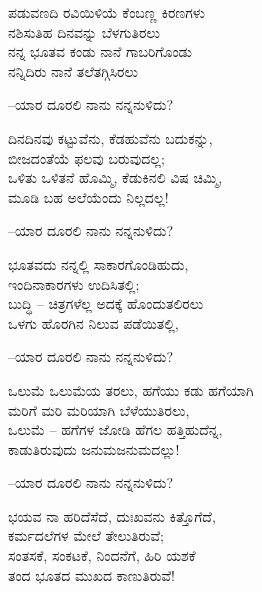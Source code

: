 \begin{myquote}
ಪಡುವಣದಿ ರವಿಯಿಳಿಯೆ ಕೆಂಬಣ್ಣ ಕಿರಣಗಳು\\ನಶಿಸುತಿಹ ದಿನವನ್ನು ಬೆಳಗುತಿರಲು\\ನನ್ನ ಭೂತವ ಕಂಡು ನಾನೆ ಗಾಬರಿಗೊಂಡು\\ನನ್ನಿದಿರು ನಾನೆ ತಲೆತಗ್ಗಿಸಿರಲು
\end{myquote}

\begin{flushright}
–ಯಾರ ದೂರಲಿ ನಾನು ನನ್ನನುಳಿದು?
\end{flushright}

\begin{myquote}
ದಿನದಿನವು ಕಟ್ಟುವೆನು, ಕೆಡಹುವೆನು ಬದುಕನ್ನು,\\ಬೀಜದಂತೆಯೆ ಫಲವು ಬರುವುದಲ್ಲ;\\ಒಳಿತು ಒಳಿತನೆ ಹೊಮ್ಮಿ, ಕೆಡುಕಿನಲಿ ವಿಷ ಚಿಮ್ಮಿ,\\ಮೂಡಿ ಬಹ ಅಲೆಯೆಂದು ನಿಲ್ಲದಲ್ಲ!
\end{myquote}

\begin{flushright}
–ಯಾರ ದೂರಲಿ ನಾನು ನನ್ನನುಳಿದು?
\end{flushright}

\begin{myquote}
ಭೂತವದು ನನ್ನಲ್ಲಿ ಸಾಕಾರಗೊಂಡಿಹುದು,\\ಇಂದಿನಾಕಾರಗಳು ಉದಿಸಿತಲ್ಲಿ;\\ಬುದ್ಧಿ – ಚಿತ್ರಗಳೆಲ್ಲ ಅದಕ್ಕೆ ಹೊಂದುತಲಿರಲು\\ಒಳಗು ಹೊರಗಿನ ನಿಲುವ ಪಡೆಯಿತಲ್ಲಿ,
\end{myquote}

\begin{flushright}
–ಯಾರ ದೂರಲಿ ನಾನು ನನ್ನನುಳಿದು?
\end{flushright}

\begin{myquote}
ಒಲುಮೆ ಒಲುಮೆಯ ತರಲು, ಹಗೆಯು ಕಡು ಹಗೆಯಾಗಿ\\ಮರಿಗೆ ಮರಿ ಮರಿಯಾಗಿ ಬೆಳೆಯುತಿರಲು,\\ಒಲುಮೆ – ಹಗೆಗಳ ಜೋಡಿ ಹೆಗಲ ಹತ್ತಿಹುದೆನ್ನ,\\ಕಾಡುತಿರುವುದು ಜನುಮಜನುಮದಲ್ಲು!
\end{myquote}

\begin{flushright}
–ಯಾರ ದೂರಲಿ ನಾನು ನನ್ನನುಳಿದು?
\end{flushright}

\begin{myquote}
ಭಯವ ನಾ ಹರಿದೆಸೆದೆ, ದುಃಖವನು ಕಿತ್ತೊಗೆದೆ,\\ಕರ್ಮದಲೆಗಳ ಮೇಲೆ ತೇಲುತಿರುವೆ;\\ಸಂತಸಕೆ, ಸಂಕಟಕೆ, ನಿಂದನೆಗೆ, ಹಿರಿ ಯಶಕೆ\\ತಂದ ಭೂತದ ಮುಖದ ಕಾಣುತಿರುವೆ!
\end{myquote}

